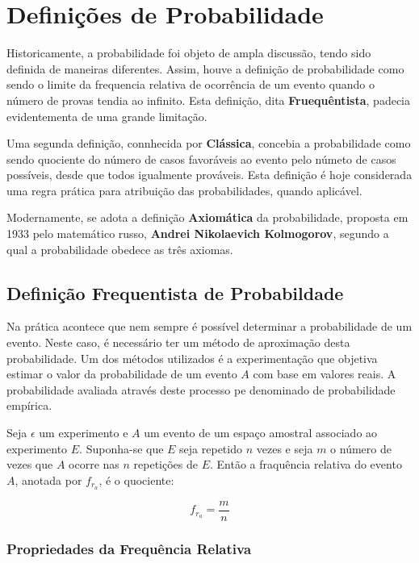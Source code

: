  
\section{Definições de Probabilidade}
 
\inic Historicamente, a probabilidade foi objeto de ampla discussão, tendo sido definida de maneiras diferentes. Assim, houve a definição de probabilidade como sendo o limite da frequencia relativa de ocorrência de um evento quando o número de provas tendia ao infinito. Esta definição, dita \textbf{Fruequêntista}, padecia evidentementa de uma grande limitação.\vskip0.3cm
 
\inic Uma segunda definição, connhecida por \textbf{Clássica}, concebia a probabilidade como sendo quociente do número de casos favoráveis ao evento pelo númeto de casos possíveis, desde que todos igualmente prováveis. Esta definição é hoje considerada uma regra prática para atribuição das probabilidades, quando aplicável.\vskip0.3cm
 
 
\inic Modernamente, se adota a definição \textbf{Axiomática} da probabilidade, proposta em 1933 pelo matemático russo, \textbf{Andrei Nikolaevich Kolmogorov}, segundo a qual a probabilidade obedece as três axiomas.
 
 
\subsection{Definição Frequentista de Probabildade}

\inic Na prática acontece que nem sempre é possível determinar a probabilidade de um evento. Neste caso, é necessário ter um método de aproximação desta probabilidade. Um dos métodos utilizados é a experimentação que objetiva estimar o valor da probabilidade de um evento $A$ com base em valores reais. A probabilidade avaliada através deste processo pe denominado de probabilidade empírica.\vskip0.3cm

\inic Seja $\epsilon$ um experimento e $A$ um evento de um espaço amostral associado ao experimento $E$. Suponha-se que $E$ seja repetido $n$ vezes e seja $m$ o número de vezes que $A$ ocorre nas $n$ repetições de $E$. Então a fraquência relativa do evento $A$, anotada por $f_{r}_{a}$, é o quociente:
 
\begin{equation}
     f_{r_{a}}= \frac{m}{n}
\end{equation}
 
 
\subsubsection{Propriedades da Frequência Relativa} 

